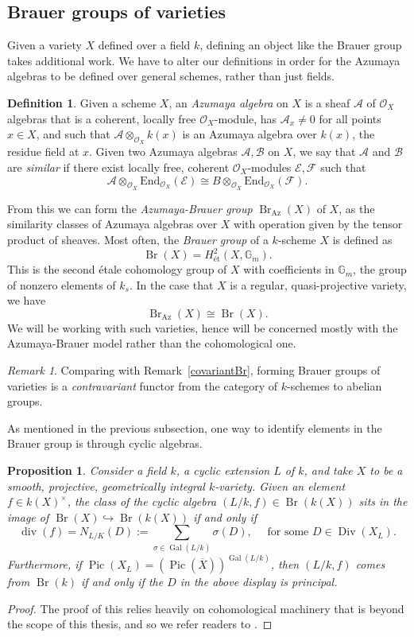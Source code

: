 \documentclass[12pt,twoside]{reedthesis}
\theoremstyle{plain}
\newtheorem{proposition}[theorem]{Proposition}
\theoremstyle{definition}
\newtheorem{definition}{Definition}[section]
\theoremstyle{remark}
\newtheorem{remark}{Remark}[section]
\newcommand{\calA}{\mathcal{A}}
\newcommand{\calO}{\mathcal{O}}
\newcommand{\Div}{\operatorname{Div}}
\newcommand{\Br}{\operatorname{Br}}
\newcommand{\Pic}{\operatorname{Pic}}
\renewcommand{\div}{\operatorname{div}}
\newcommand{\Gal}{\operatorname{Gal}}
\begin{document}
\subsection{Brauer groups of varieties}
Given a variety $X$ defined over a field $k$, defining an object like the Brauer group takes additional work. We have to alter our definitions in order for the Azumaya algebras to be defined over general schemes, rather than just fields.
\begin{definition}
Given a scheme $X$, an \emph{Azumaya algebra} on $X$ is a sheaf $\calA$ of $\calO_X$ algebras that is a coherent, locally free $\calO_X$-module, has $\calA_x\neq0$ for all points $x\in X$, and such that $\calA\otimes_{\calO_X} k(x)$ is an Azumaya algebra over $k(x)$, the residue field at $x$. Given two Azumaya algebras $\mathcal{A},\mathcal{B}$ on $X$, we say that $\mathcal{A}$ and $\mathcal{B}$ are \emph{similar} if there exist locally free, coherent $\calO_X$-modules $\mathcal{E},\mathcal{F}$ such that 
\[
\mathcal{A}\otimes_{\calO_X}\text{End}_{\calO_X}(\mathcal{E})\cong B\otimes_{\calO_X}\text{End}_{\calO_X}(\mathcal{F}).
\]
\end{definition}
\noindent From this we can form the \emph{Azumaya-Brauer group} $\Br_\text{Az}(X)$ of $X$, as the similarity classes of Azumaya algebras over $X$ with operation given by the tensor product of sheaves. Most often, the \emph{Brauer group} of a $k$-scheme $X$ is defined as \[\Br(X)=H^2_\text{\'et}(X,\mathbb{G}_m).\] This is the second \'etale cohomology group of $X$ with coefficients in $\mathbb{G}_m$, the group of nonzero elements of $k_s$. In the case that $X$ is a regular, quasi-projective variety, we have \[\Br_\text{Az}(X)\cong \Br(X).\] We will be working with such varieties, hence will be concerned mostly with the Azumaya-Brauer model rather than the cohomological one.
\begin{remark}
Comparing with Remark~\ref{covariantBr}, forming Brauer groups of varieties is a \emph{contravariant} functor from the category of $k$-schemes to abelian groups.
\end{remark}
As mentioned in the previous subsection, one way to identify elements in the Brauer group is through cyclic algebras.
\begin{proposition}
Consider a field $k$, a cyclic extension $L$ of $k$, and take $X$ to be a smooth, projective, geometrically integral $k$-variety. Given an element $f\in k(X)^\times$, the class of the cyclic algebra $(L/k,f)\in\Br(k(X))$ sits in the image of $\Br(X)\hookrightarrow\Br(k(X))$ if and only if
\[
\div(f)=N_{L/K}(D):=\sum_{\sigma\in\Gal(L/k)}\sigma(D),\quad\text{ for some $D\in\Div(X_L)$.}
\] 
Furthermore, if $\Pic(X_L)=(\Pic(\overline{X}))^{\Gal(L/k)}$, then $(L/k,f)$ comes from $\Br(k)$ if and only if the $D$ in the above display is principal.
\end{proposition}
\begin{proof}
The proof of this relies heavily on cohomological machinery that is beyond the scope of this thesis, and so we refer readers to \cite[Proposition 2.2.3]{corn}. 
\end{proof}
\end{document}
